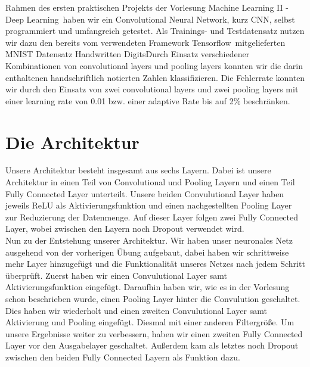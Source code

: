 \documentclass[10pt,journal,compsoc]{IEEEtran}
\begin{document}
\maketitle
\IEEEdisplaynontitleabstractindextext
\IEEEpeerreviewmaketitle
{}
 Rahmen des ersten praktischen Projekts der Vorlesung \glqq Machine Learning II - Deep Learning\grqq\ haben wir ein Convolutional Neural Network, kurz CNN, selbst programmiert und umfangreich getestet. Als Trainings- und Testdatensatz nutzen wir dazu den bereits vom verwendeten Framework \glqq Tensorflow\grqq\ mitgelieferten MNIST Datensatz \glqq Handwritten Digits\grqq\. Durch Einsatz verschiedener Kombinationen von convolutional layers und pooling layers konnten wir die darin enthaltenen handschriftlich notierten Zahlen klassifizieren. Die Fehlerrate konnten wir durch den Einsatz von zwei convolutional layers und zwei pooling layers mit einer learning rate von 0.01 bzw. einer adaptive Rate bis auf 2\% beschränken.

\section{Die Architektur}
Unsere Architektur besteht insgesamt aus sechs Layern.
Dabei ist unsere Architektur in einen Teil von Convolutional und Pooling Layern und einen Teil Fully Connected Layer unterteilt. Unsere beiden Convulutional Layer haben jeweils ReLU als Aktivierungsfunktion und einen nachgestellten Pooling Layer zur Reduzierung der Datenmenge. Auf dieser Layer folgen zwei Fully Connected Layer, wobei zwischen den Layern noch Dropout verwendet wird.\\

\noindent Nun zu der Entstehung unserer Architektur. Wir haben unser neuronales Netz ausgehend von der vorherigen Übung aufgebaut, dabei haben wir schrittweise mehr Layer hinzugefügt und die Funktionalität unseres Netzes nach jedem Schritt überprüft. Zuerst haben wir einen Convulutional Layer samt Aktivierungsfunktion eingefügt. Daraufhin haben wir, wie es in der Vorlesung schon beschrieben wurde, einen Pooling Layer hinter die Convulution geschaltet. Dies haben wir wiederholt und einen zweiten Convulutional Layer samt Aktivierung und Pooling eingefügt. Diesmal mit einer anderen Filtergröße. Um unsere Ergebnisse weiter zu verbessern, haben wir einen zweiten Fully Connected Layer vor den Ausgabelayer geschaltet. Außerdem kam als letztes noch Dropout zwischen den beiden Fully Connected Layern als Funktion dazu.\\
\end{document}
